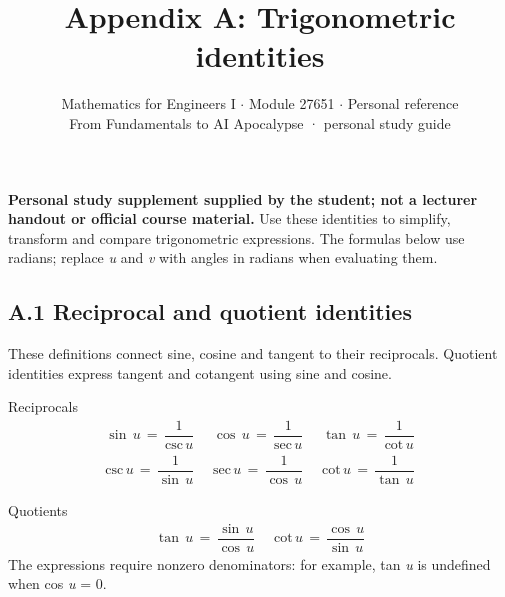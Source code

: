 \documentclass[11pt]{article}
\title{\sffamily\bfseries\color{FAUblue}Appendix A: Trigonometric identities}
\author{Mathematics for Engineers I \ensuremath{\cdot} Module 27651 \ensuremath{\cdot} Personal reference\\[2pt]\small From Fundamentals to AI Apocalypse · personal study guide}
\date{}
\begin{document}
\maketitle
\begingroup\footnotesize\setlength{\parskip}{0pt}\tableofcontents\endgroup
\clearpage

{\large \textbf{Personal study supplement supplied by the student; not a lecturer handout or official course material.} Use these identities to simplify, transform and compare trigonometric expressions. The formulas below use radians; replace \textit{u} and \textit{v} with angles in radians when evaluating them.}


\begin{keepsection}
\section{A.1 Reciprocal and quotient identities}

These definitions connect sine, cosine and tangent to their reciprocals. Quotient identities express tangent and cotangent using sine and cosine.

\begin{equationcard}{Reciprocals}
\[ \begin{gathered} \sin \, {u}\, =\, \dfrac{1}{\text{csc}\, {u}}\, \quad \, \cos \, {u}\, =\, \dfrac{1}{\text{sec}\, {u}}\, \quad \, \tan \, {u}\, =\, \dfrac{1}{\text{cot}\, {u}} \\ \text{csc}\, {u}\, =\, \dfrac{1}{\sin \, {u}}\, \quad \, \text{sec}\, {u}\, =\, \dfrac{1}{\cos \, {u}}\, \quad \, \text{cot}\, {u}\, =\, \dfrac{1}{\tan \, {u}} \end{gathered} \]
\end{equationcard}

\begin{equationcard}{Quotients}
\[ \begin{gathered} \tan \, {u}\, =\, \dfrac{\sin \, {u}}{\cos \, {u}}\, \quad \, \text{cot}\, {u}\, =\, \dfrac{\cos \, {u}}{\sin \, {u}} \end{gathered} \]
{\small The expressions require nonzero denominators: for example, tan \textit{u} is undefined when cos \textit{u} = 0.}
\end{equationcard}
\end{keepsection}
\end{document}
